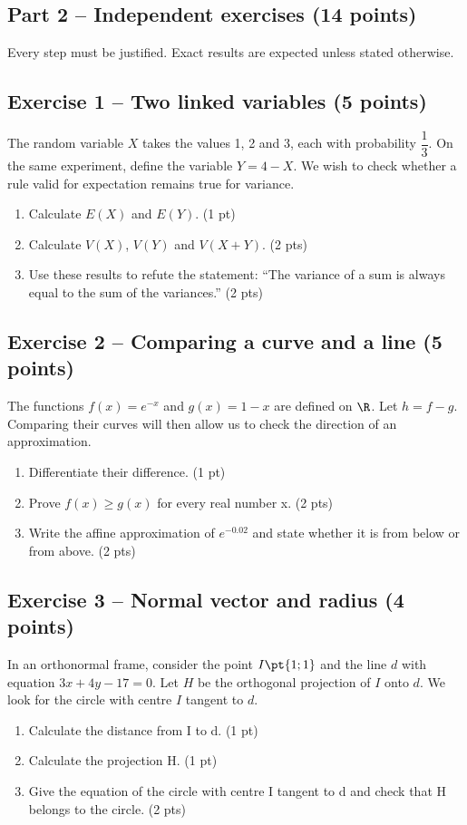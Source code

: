 \mxnewpage\subsection*{Part 2 -- Independent exercises (14 points)}
Every step must be justified. Exact results are expected unless stated otherwise.
\subsection*{Exercise 1 -- Two linked variables (5 points)}
The random variable $X$ takes the values 1, 2 and 3, each with probability $\dfrac13$. On the same experiment, define the variable $Y=4-X$. We wish to check whether a rule valid for expectation remains true for variance.
\begin{enumerate}
\item Calculate $E(X)$ and $E(Y)$. \hfill(1 pt)
\item Calculate $V(X)$, $V(Y)$ and $V(X+Y)$. \hfill(2 pts)
\item Use these results to refute the statement: ``The variance of a sum is always equal to the sum of the variances.'' \hfill(2 pts)
\end{enumerate}
\subsection*{Exercise 2 -- Comparing a curve and a line (5 points)}
The functions $f(x)=e^{-x}$ and $g(x)=1-x$ are defined on $\R$. Let $h=f-g$. Comparing their curves will then allow us to check the direction of an approximation.
\begin{enumerate}
\item Differentiate their difference. \hfill(1 pt)
\item Prove $f(x)\geq g(x)$ for every real number x. \hfill(2 pts)
\item Write the affine approximation of $e^{-\num{0,02}}$ and state whether it is from below or from above. \hfill(2 pts)
\end{enumerate}
\subsection*{Exercise 3 -- Normal vector and radius (4 points)}
In an orthonormal frame, consider the point $I\pt{1;1}$ and the line $d$ with equation $3x+4y-17=0$. Let $H$ be the orthogonal projection of $I$ onto $d$. We look for the circle with centre $I$ tangent to $d$.
\begin{enumerate}
\item Calculate the distance from I to d. \hfill(1 pt)
\item Calculate the projection H. \hfill(1 pt)
\item Give the equation of the circle with centre I tangent to d and check that H belongs to the circle. \hfill(2 pts)
\end{enumerate}
